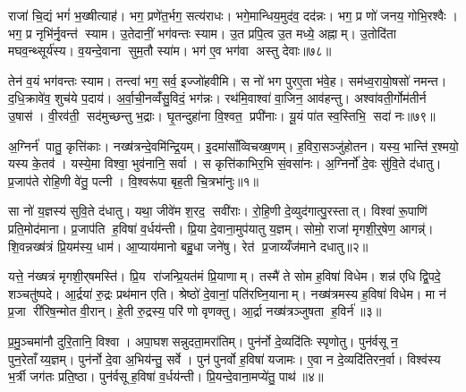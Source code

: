 राजा॑ चि॒द्यं भगं॑ भ॒ख्षीत्याह॑। भग॒ प्रणे॑त॒र्भग॒ सत्य॑राधः। भगे॒मान्धिय॒मुद॑व॒ दद॑न्नः। भग॒ प्र णो॑ जनय॒ गोभि॒रश्वैः। भग॒ प्र नृभि॑र्नृ॒वन्त॑ स्याम। उ॒तेदानीं॒ भग॑वन्तः स्याम। उ॒त प्रपि॒त्व उ॒त मध्ये॒ अह्नाम्। उ॒तोदि॑ता मघव॒न्थ्सूर्य॑स्य। व॒यन्दे॒वाना सुम॒तौ स्या॑म। भग॑ ए॒व भग॑वा अस्तु देवाः॥७८॥

तेन॑ व॒यं भग॑वन्तः स्याम। तन्त्वा॑ भग॒ सर्व॒ इज्जो॑हवीमि। स नो॑ भग पुरए॒ता भ॑वे॒ह। सम॑ध्व॒रायो॒षसो॑ नमन्त। द॒धि॒क्रावे॑व॒ शुच॑ये प॒दाय॑। अ॒र्वा॒ची॒नव्वँ॑सु॒विदं॒ भग॑न्नः। रथ॑मि॒वाश्वा॑ वा॒जिन॒ आव॑हन्तु। अश्वा॑वती॒र्गोम॑तीर्न उ॒षास॑। वी॒रव॑ती॒ सद॑मुच्छन्तु भ॒द्राः। घृ॒तन्दुहा॑ना वि॒श्वत॒ प्रपी॑नाः। यू॒यं पा॑त स्व॒स्तिभि॒ सदा॑ नः॥७९॥

\clearpage
{}


\setcounter{anuvakam}{0}
अ॒ग्निर्न॑ पातु॒ कृत्ति॑काः। नख्ष॑त्रन्दे॒वमि॑न्द्रि॒यम्। इ॒दमा॑साँव्विचख्ष॒णम्। ह॒विरा॒सञ्जु॑होतन। यस्य॒ भान्ति॑ र॒श्मयो॒ यस्य के॒तव॑। यस्ये॒मा विश्वा॒ भुव॑नानि॒ सर्वा। स कृत्ति॑काभिर॒भि सं॒वसा॑नः। अ॒ग्निर्नो॑ दे॒वः सु॑वि॒ते द॑धातु। प्र॒जाप॑ते रोहि॒णी वे॑तु॒ पत्नी। वि॒श्वरू॑पा बृह॒ती चि॒त्रभा॑नुः॥१॥

सा नो॑ य॒ज्ञस्य॑ सुवि॒ते द॑धातु। यथा॒ जीवे॑म श॒रद॒ सवी॑राः। रो॒हि॒णी दे॒व्युद॑गात्पु॒रस्तात्। विश्वा॑ रू॒पाणि॑ प्रति॒मोद॑माना। प्र॒जाप॑ति ह॒विषा॑ व॒र्धय॑न्ती। प्रि॒या दे॒वाना॒मुप॑यातु य॒ज्ञम्। सोमो॒ राजा॑ मृगशी॒र्॒षेण॒ आगन्न्॑। शि॒वन्नख्ष॑त्रं प्रि॒यम॑स्य॒ धाम॑। आ॒प्याय॑मानो बहु॒धा जने॑षु। रेत॑ प्र॒जाय्यँज॑माने दधातु॥२॥

यत्ते॒ न॑ख्षत्रं मृगशी॒र्‌षमस्ति॑। प्रि॒य रा॑जन्प्रि॒यत॑मं प्रि॒याणाम्। तस्मै॑ ते सोम ह॒विषा॑ विधेम। शन्न॑ एधि द्वि॒पदे॒ शञ्चतु॑ष्पदे। आ॒र्द्रया॑ रु॒द्रः प्रथ॑मान एति। श्रेष्ठो॑ दे॒वानां॒ पति॑रघ्नि॒यानाम्। नख्ष॑त्रमस्य ह॒विषा॑ विधेम। मा न॑ प्र॒जा री॑रिष॒न्मोत वी॒रान्। हे॒ती रु॒द्रस्य॒ परि॑ णो वृणक्तु। आ॒र्द्रा नख्ष॑त्रञ्जुषता ह॒विर्न॑॥३॥

प्र॒मु॒ञ्चमा॑नौ दुरि॒तानि॒ विश्वा। अपा॒घशसन्नुदता॒मरा॑तिम्। पुन॑र्नो दे॒व्यदि॑तिः स्पृणोतु। पुन॑र्वसू न॒ पुन॒रेताँय्य॒ज्ञम्। पुन॑र्नो दे॒वा अ॒भिय॑न्तु॒ सर्वे। पुन॑पुनर्वो ह॒विषा॑ यजामः। ए॒वा न दे॒व्यदि॑तिरन॒र्वा। विश्व॑स्य भ॒र्त्री जग॑तः प्रति॒ष्ठा। पुन॑र्वसू ह॒विषा॑ व॒र्धय॑न्ती। प्रि॒यन्दे॒वाना॒मप्ये॑तु॒ पाथ॑॥४॥

